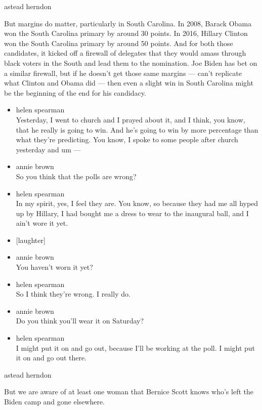 astead herndon

But margins do matter, particularly in South Carolina. In 2008, Barack
Obama won the South Carolina primary by around 30 points. In 2016,
Hillary Clinton won the South Carolina primary by around 50 points. And
for both those candidates, it kicked off a firewall of delegates that
they would amass through black voters in the South and lead them to the
nomination. Joe Biden has bet on a similar firewall, but if he doesn't
get those same margins --- can't replicate what Clinton and Obama did
--- then even a slight win in South Carolina might be the beginning of
the end for his candidacy.

\begin{itemize}
\item
  helen spearman\\
  Yesterday, I went to church and I prayed about it, and I think, you
  know, that he really is going to win. And he's going to win by more
  percentage than what they're predicting. You know, I spoke to some
  people after church yesterday and um ---
\item
  annie brown\\
  So you think that the polls are wrong?
\item
  helen spearman\\
  In my spirit, yes, I feel they are. You know, so because they had me
  all hyped up by Hillary, I had bought me a dress to wear to the
  inaugural ball, and I ain't wore it yet.
\item
  {[}laughter{]}
\item
  annie brown\\
  You haven't worn it yet?
\item
  helen spearman\\
  So I think they're wrong. I really do.
\item
  annie brown\\
  Do you think you'll wear it on Saturday?
\item
  helen spearman\\
  I might put it on and go out, because I'll be working at the poll. I
  might put it on and go out there.
\end{itemize}

astead herndon

But we are aware of at least one woman that Bernice Scott knows who's
left the Biden camp and gone elsewhere.

